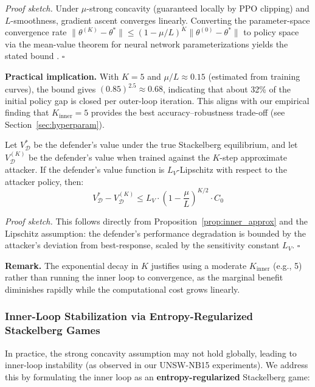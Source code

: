 \textit{Proof sketch.} Under $\mu$-strong concavity (guaranteed locally by PPO clipping) and $L$-smoothness, gradient ascent converges linearly. Converting the parameter-space convergence rate $\|\theta^{(K)} - \theta^*\| \leq (1-\mu/L)^K \|\theta^{(0)} - \theta^*\|$ to policy space via the mean-value theorem for neural network parameterizations yields the stated bound \cite{sinha2018bilevel}. $\square$

\textbf{Practical implication.} With $K=5$ and $\mu/L \approx 0.15$ (estimated from training curves), the bound gives $(0.85)^{2.5} \approx 0.68$, indicating that about 32\% of the initial policy gap is closed per outer-loop iteration. This aligns with our empirical finding that $K_{\text{inner}}=5$ provides the best accuracy--robustness trade-off (see Section~\ref{sec:hyperparam}).

\begin{proposition}
\label{prop:defender_subopt}
Let $V_{\mathcal{D}}^*$ be the defender's value under the true Stackelberg equilibrium, and let $V_{\mathcal{D}}^{(K)}$ be the defender's value when trained against the $K$-step approximate attacker. If the defender's value function is $L_V$-Lipschitz with respect to the attacker policy, then:
\begin{equation}
    V_{\mathcal{D}}^* - V_{\mathcal{D}}^{(K)} \leq L_V \cdot \left(1 - \frac{\mu}{L}\right)^{K/2} \cdot C_0
    \label{eq:defender_bound}
\end{equation}
\end{proposition}

\textit{Proof sketch.} This follows directly from Proposition~\ref{prop:inner_approx} and the Lipschitz assumption: the defender's performance degradation is bounded by the attacker's deviation from best-response, scaled by the sensitivity constant $L_V$. $\square$

\textbf{Remark.} The exponential decay in $K$ justifies using a moderate $K_{\text{inner}}$ (e.g., 5) rather than running the inner loop to convergence, as the marginal benefit diminishes rapidly while the computational cost grows linearly.

\subsubsection{Inner-Loop Stabilization via Entropy-Regularized Stackelberg Games}
\label{sec:stabilization}

In practice, the strong concavity assumption may not hold globally, leading to inner-loop instability (as observed in our UNSW-NB15 experiments). We address this by formulating the inner loop as an \textbf{entropy-regularized} Stackelberg game:

